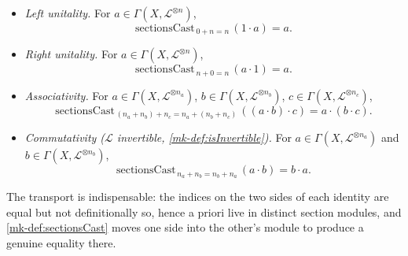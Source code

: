 \begin{lemma}
  \begin{itemize}
    \item \emph{Left unitality.} For \(a \in \Gamma(X, \mathcal{L}^{\otimes n})\),
      \[
        \mathrm{sectionsCast}_{\,0+n=n}\,(1 \cdot a) = a .
      \]
    \item \emph{Right unitality.} For \(a \in \Gamma(X, \mathcal{L}^{\otimes n})\),
      \[
        \mathrm{sectionsCast}_{\,n+0=n}\,(a \cdot 1) = a .
      \]
    \item \emph{Associativity.} For
      \(a \in \Gamma(X, \mathcal{L}^{\otimes n_a})\),
      \(b \in \Gamma(X, \mathcal{L}^{\otimes n_b})\),
      \(c \in \Gamma(X, \mathcal{L}^{\otimes n_c})\),
      \[
        \mathrm{sectionsCast}_{\,(n_a+n_b)+n_c = n_a+(n_b+n_c)}\,
          ((a \cdot b) \cdot c) = a \cdot (b \cdot c) .
      \]
    \item \emph{Commutativity (\(\mathcal{L}\) invertible,
      \ref{mk-def:isInvertible}).} For
      \(a \in \Gamma(X, \mathcal{L}^{\otimes n_a})\) and
      \(b \in \Gamma(X, \mathcal{L}^{\otimes n_b})\),
      \[
        \mathrm{sectionsCast}_{\,n_a+n_b = n_b+n_a}\,(a \cdot b) = b \cdot a .
      \]
  \end{itemize}
  The transport is indispensable: the indices on the two sides of each identity
  are equal but not definitionally so, hence a priori live in distinct section
  modules, and \ref{mk-def:sectionsCast} moves one side into the other's module to
  produce a genuine equality there.
\end{lemma}

